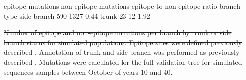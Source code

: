 \documentclass[9pt,lineno]{elife} %
\providecommand{\DIFdel}[1]{{\protect\color{red}\sout{#1}}}                      %
\providecommand{\DIFdelFL}[1]{\DIFdel{#1}} %
\providecommand{\DIFdeltex}[1]{{\protect\color{red}\sout{#1}}}                      %
\providecommand{\DIFdelFL}[1]{\DIFdel{#1}} %
\providecommand{\DIFdel}[1]{\texorpdfstring{\DIFdeltex{#1}}{}} %
\begin{document}
\DIFdelFL{epitope mutations }%
\DIFdelFL{non-epitope mutations }%
\DIFdelFL{epitope-to-non-epitope ratio }%
\DIFdelFL{branch type }%
\DIFdelFL{side branch }%
\DIFdelFL{590 }%
\DIFdelFL{1327 }%
\DIFdelFL{0.44 }%
\DIFdelFL{trunk       }%
\DIFdelFL{23 }%
\DIFdelFL{12 }%
\DIFdelFL{1.92 }%

{%
\DIFdelFL{Number of epitope and non-epitope mutations per branch by trunk or side branch status for simulated populations.
    Epitope sites were defined previously described }%
\DIFdelFL{.
    Annotation of trunk and side branch was performed as previously described }%
\DIFdelFL{.
    Mutations were calculated for the full validation tree for simulated sequences samples between October of years 10 and 40.
    }}
\end{document}
